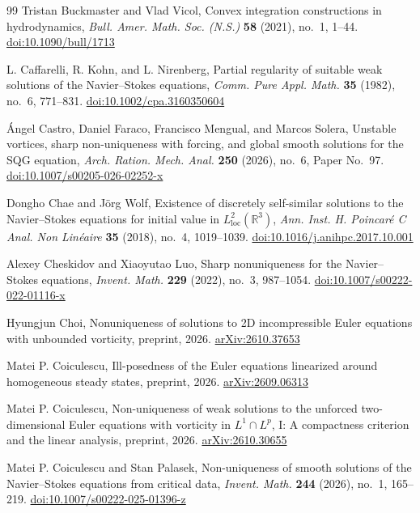 \begin{thebibliography}{99}
Tristan Buckmaster and Vlad Vicol, Convex integration constructions in hydrodynamics,
\emph{Bull. Amer. Math. Soc. (N.S.)} \textbf{58} (2021), no.~1, 1--44.
\href{https://doi.org/10.1090/bull/1713}{doi:10.1090/bull/1713}

L. Caffarelli, R. Kohn, and L. Nirenberg, Partial regularity of suitable weak solutions of the
Navier--Stokes equations, \emph{Comm. Pure Appl. Math.} \textbf{35} (1982), no.~6, 771--831.
\href{https://doi.org/10.1002/cpa.3160350604}{doi:10.1002/cpa.3160350604}

\'{A}ngel Castro, Daniel Faraco, Francisco Mengual, and Marcos Solera, Unstable vortices, sharp
non-uniqueness with forcing, and global smooth solutions for the SQG equation,
\emph{Arch. Ration. Mech. Anal.} \textbf{250} (2026), no.~6, Paper No.~97.
\href{https://doi.org/10.1007/s00205-026-02252-x}{doi:10.1007/s00205-026-02252-x}

Dongho Chae and J\"{o}rg Wolf, Existence of discretely self-similar solutions to the Navier--Stokes
equations for initial value in $L^2_{\mathrm{loc}}(\mathbb{R}^3)$, \emph{Ann. Inst. H. Poincar\'{e} C
Anal. Non Lin\'{e}aire} \textbf{35} (2018), no.~4, 1019--1039.
\href{https://doi.org/10.1016/j.anihpc.2017.10.001}{doi:10.1016/j.anihpc.2017.10.001}

Alexey Cheskidov and Xiaoyutao Luo, Sharp nonuniqueness for the Navier--Stokes equations,
\emph{Invent. Math.} \textbf{229} (2022), no.~3, 987--1054.
\href{https://doi.org/10.1007/s00222-022-01116-x}{doi:10.1007/s00222-022-01116-x}

Hyungjun Choi, Nonuniqueness of solutions to 2D incompressible Euler
equations with unbounded vorticity, preprint, 2026.
\href{https://arxiv.org/abs/2610.37653}{arXiv:2610.37653}

Matei P. Coiculescu, Ill-posedness of the Euler equations linearized around
homogeneous steady states, preprint, 2026.
\href{https://arxiv.org/abs/2609.06313}{arXiv:2609.06313}

Matei P. Coiculescu, Non-uniqueness of weak solutions to the unforced
two-dimensional Euler equations with vorticity in $L^1\cap L^p$, I: A
compactness criterion and the linear analysis, preprint, 2026.
\href{https://arxiv.org/abs/2610.30655}{arXiv:2610.30655}

Matei P. Coiculescu and Stan Palasek, Non-uniqueness of smooth solutions of the Navier--Stokes equations
from critical data, \emph{Invent. Math.} \textbf{244} (2026), no.~1, 165--219.
\href{https://doi.org/10.1007/s00222-025-01396-z}{doi:10.1007/s00222-025-01396-z}


\end{thebibliography}
